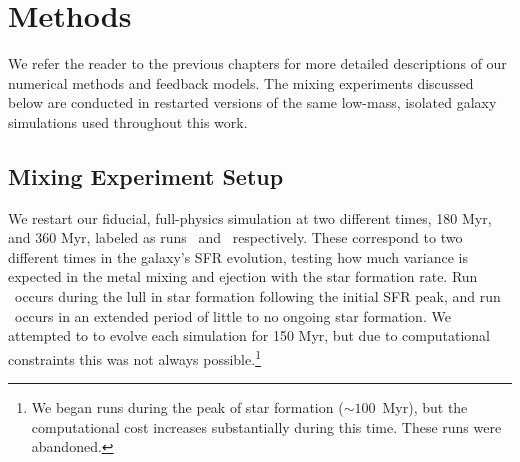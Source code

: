 \section{Methods}
\label{ch4:sec:methods}
We refer the reader to the previous chapters for more detailed descriptions of our numerical methods and feedback models. The mixing experiments discussed below are conducted in restarted versions of the same low-mass, isolated galaxy simulations used throughout this work.




\subsection{Mixing Experiment Setup}
\label{ch4:sec:experiment}
We restart our fiducial, full-physics simulation at two different times, 180 Myr, and 360 Myr, labeled as runs \runonenu~and \runtwonu~respectively. These correspond to two different times in the galaxy's SFR evolution, testing how much variance is expected in the metal mixing and ejection with the star formation rate. Run \runonenu~occurs during the lull in star formation following the initial SFR peak, and run \runtwonu~occurs in an extended period of little to no ongoing star formation. We attempted to to evolve each simulation for 150 Myr, but due to computational constraints this was not always possible.\footnote{We began runs during the peak of star formation ($\sim 100$~Myr), but the computational cost increases substantially during this time. These runs were abandoned.}



